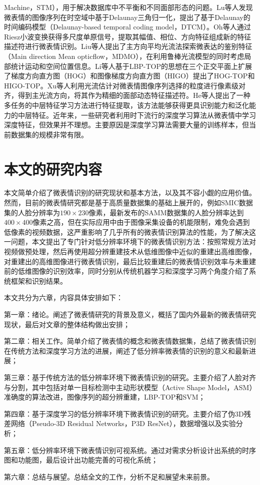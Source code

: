 Machine，STM），用于解决数据库中不平衡和不同面部形态的问题\citep{le2014spontaneous}。Lu等人发现微表情的图像序列在时空域中基于Delaunay三角归一化，提出了基于Delaunay的时间编码模型（Delaunay-based temporal coding model，DTCM）\citep{lu2014delaunay}。Oh等人通过Riesz小波变换获得多尺度单原信号，提取其幅值、相位、方向特征组成新的特征描述符进行微表情识别\citep{oh2015monogenic}。Liu等人提出了主方向平均光流法探索微表达的鉴别特征（Main direction Mean opticflow，MDMO），在利用鲁棒光流模型的同时考虑局部统计运动和空间位置信息\citep{liu2016mainl}。Li等人基于LBP-TOP的思想在三个正交平面上扩展了梯度方向直方图（HOG）和图像梯度方向直方图（HIGO）提出了HOG-TOP和HIGO-TOP。Xu等人利用光流估计对微表情图像序列选择的粒度进行像素级对齐，得到主光流方向，将其作为精细的面部动态特征描述符\citep{xu2017microexpression}。He等人提出了一种多任务的中层特征学习方法进行特征提取，该方法能够获得更具识别能力和泛化能力的中层特征\citep{he2017multi}。近年来，一些研究者利用时下流行的深度学习算法从微表情中学习深度特征，但效果并不理想。主要原因是深度学习算法需要大量的训练样本，但当前数据集的规模非常有限\citep{patel2016selective}。

\section{本文的研究内容}

本文简单介绍了微表情识别的研究现状和基本方法，以及其不容小觑的应用价值。然而，目前的微表情研究都是基于高质量数据集的基础上展开的，例如SMIC数据集的人脸分辨率为$190\times230$像素，最新发布的SAMM数据集的人脸分辨率达到$400\times400$像素之高，但在实际应用中由于图像采集设备的机能限制，难免会遇到低像素的视频数据，这严重影响了几乎所有的微表情识别算法的性能，为了解决这一问题，本文提出了专门针对低分辨率环境下的微表情识别方法：按照常规方法对视频做预处理，然后再使用超分辨重建技术从低维图像中近似的重建出高维图像，对重建出的高维图像进行微表情识别，最后比较重建后的微表情识别效率与未重建前的低维图像的识别效率，同时分别从传统机器学习和深度学习两个角度介绍了系统框架和识别结果。

本文共分为六章，内容具体安排如下：

第一章：绪论。阐述了微表情研究的背景及意义，概括了国内外最新的微表情研究现状，最后对文章的整体结构做出安排；

第二章：相关工作。简单介绍了微表情的概念和微表情数据集，总结了微表情识别在传统方法和深度学习方法的进展，阐述了低分辨率微表情的识别的意义和最新进展；

第三章：基于传统方法的低分辨率环境下微表情识别的研究。主要介绍了人脸对齐与分割，其中包括对单一目标检测中主动形状模型（Active Shape Model，ASM）准确度的算法改进，图像序列的超分辨重建，LBP-TOP和SVM；

第四章：基于深度学习的低分辨率环境下微表情识别的研究。主要介绍了伪3D残差网络（Pseudo-3D Residual Networks，P3D ResNet），数据增强以及实验分析；

第五章：低分辨率环境下微表情识别可视系统。通过对需求分析设计出系统的时序图和功能图，最后设计出功能完善的可视化系统；

第六章：总结与展望。总结全文的工作，分析不足和展望未来前景。
